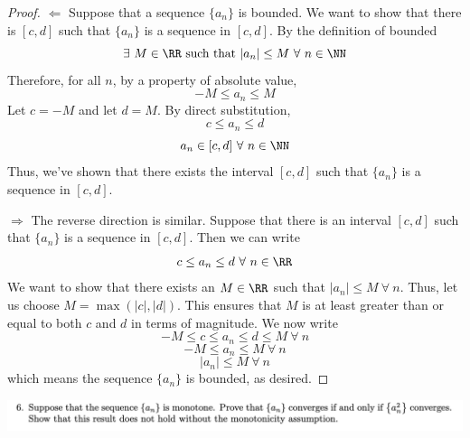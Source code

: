 \documentclass[12pt]{scrartcl}
\begin{document}
\begin{proof}
  
\hfill

$\Longleftarrow$ Suppose that a sequence $\{a_n\}$ is bounded. We want to show that 
there is $[c, d]$ such that $\{a_n\}$ is a sequence in $[c, d]$. By the definition of bounded
\[\exists \ M \in \RR \text{ such that } |a_n| \leq M \ \forall \ n \in \NN\]
Therefore, for all $n$, by a property of absolute value,
\[-M \leq a_n \leq M\]
Let $c = -M$ and let $d = M$. By direct substitution, 
\[c \leq a_n \leq d\]
\[a_n \in [c, d] \ \forall \ n \in \NN\]
Thus, we've shown that there exists the interval $[c,d]$ such that $\{a_n\}$ is a sequence in $[c, d]$. 
\hfill

$\Longrightarrow$ The reverse direction is similar. Suppose that there is an interval 
$[c, d]$ such that $\{a_n\}$ is a sequence in $[c,d]$. Then we can write 
\[c \leq a_n \leq d \ \forall \ n \in \RR\]
We want to show that there exists an $M \in \RR$ such that $|a_n| \leq M \ \forall \ n$. 
Thus, let us choose $M = \max(|c|, |d|)$. This ensures that $M$ is at least greater than or equal to both 
$c$ and $d$ in terms of magnitude. We now write 
\[-M \leq c \leq a_n \leq d \leq M \ \forall \ n\]
\[-M \leq a_n \leq M \ \forall \ n\]
\[|a_n| \leq M \ \forall \ n\]
which means the sequence $\{a_n\}$ is bounded, as desired.
\end{proof}

\newpage

\includegraphics[width=15cm]{6.png}
\end{document}
